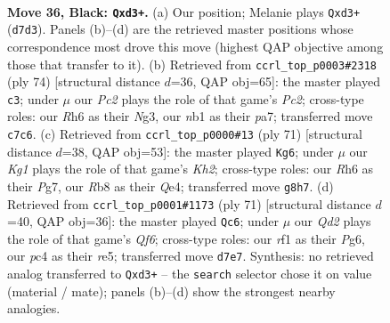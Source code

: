 \documentclass[11pt]{article}
\begin{document}
\clearpage

\begin{figure}[p]\centering
\begin{subfigure}{0.46\textwidth}\centering
\resizebox{\linewidth}{!}{%
\newchessgame
\chessboard[
  setfen={1r4k1/2pq1p2/7r/2Q5/2P1P1P1/3P2K1/8/1N3R2 b - - 2 36},
  showmover=false,
  pgfstyle=straightmove, color=movearrow, markmove={d7-d3}
]}
\caption{}
\end{subfigure}\hfill
\begin{subfigure}{0.46\textwidth}\centering
\resizebox{\linewidth}{!}{%
\newchessgame
\chessboard[
  setfen={r6k/p3R1p1/2p4p/8/2q5/6N1/P1PQ3P/6K1 w - - 2 38},
  showmover=false,
  pgfstyle=straightmove, color=movearrow, markmove={c2-c3}
]}
\caption{}
\end{subfigure}
\\[4pt]
\begin{subfigure}{0.46\textwidth}\centering
\resizebox{\linewidth}{!}{%
\newchessgame
\chessboard[
  setfen={8/6pk/1P1Q1p2/7p/4q2P/6P1/1r3P2/2R3K1 b - - 0 36},
  showmover=false,
  pgfstyle=straightmove, color=movearrow, markmove={h7-g6}
]}
\caption{}
\end{subfigure}\hfill
\begin{subfigure}{0.46\textwidth}\centering
\resizebox{\linewidth}{!}{%
\newchessgame
\chessboard[
  setfen={r5k1/1p1Q1pp1/6p1/4R3/P7/5qP1/5P1P/6K1 b - - 4 36},
  showmover=false,
  pgfstyle=straightmove, color=movearrow, markmove={f3-c6}
]}
\caption{}
\end{subfigure}
\caption{\textbf{Move 36, Black: \texttt{Qxd3+}.} (a) Our position; Melanie plays \texttt{Qxd3+} (\texttt{d7d3}). Panels (b)--(d) are the retrieved master positions whose correspondence most drove this move (highest QAP objective among those that transfer to it). (b) Retrieved from \texttt{ccrl\_top\_p0003\#2318} (ply 74) [structural distance $d$=36, QAP obj=65]: the master played \texttt{c3}; under $\mu$ our \emph{Pc2} plays the role of that game's \emph{Pc2}; cross-type roles: our \emph{R}h6 as their \emph{N}g3, our \emph{n}b1 as their \emph{p}a7; transferred move \texttt{c7c6}. (c) Retrieved from \texttt{ccrl\_top\_p0000\#13} (ply 71) [structural distance $d$=38, QAP obj=53]: the master played \texttt{Kg6}; under $\mu$ our \emph{Kg1} plays the role of that game's \emph{Kh2}; cross-type roles: our \emph{R}h6 as their \emph{P}g7, our \emph{R}b8 as their \emph{Q}e4; transferred move \texttt{g8h7}. (d) Retrieved from \texttt{ccrl\_top\_p0001\#1173} (ply 71) [structural distance $d$=40, QAP obj=36]: the master played \texttt{Qc6}; under $\mu$ our \emph{Qd2} plays the role of that game's \emph{Qf6}; cross-type roles: our \emph{r}f1 as their \emph{P}g6, our \emph{p}c4 as their \emph{r}e5; transferred move \texttt{d7e7}. Synthesis: no retrieved analog transferred to \texttt{Qxd3+} -- the \texttt{search} selector chose it on value (material / mate); panels (b)--(d) show the strongest nearby analogies.}
\label{fig:thought-m71}
\end{figure}
\end{document}
